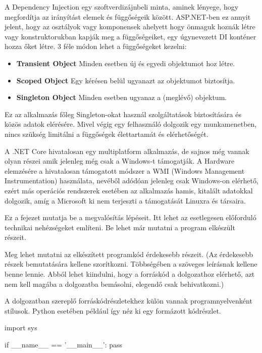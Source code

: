 A Dependency Injection egy szoftverdizájnbeli minta, aminek lényege, hogy megfordítja az irányítást elemek és függőségeik között. ASP.NET-ben ez annyit jelent, hogy az osztályok vagy komponensek ahelyett hogy önmaguk hoznák létre vagy konstruktorukban kapják meg a függőségeiket, egy úgynevezett DI konténer hozza őket létre. 3 féle módon lehet a függőségeket kezelni:
\begin{itemize}
\item\textbf{Transient Object} Minden esetben új és egyedi objektumot hoz létre.
\item\textbf{Scoped Object} Egy kérésen belül ugyanazt az objektumot biztosítja.
\item\textbf{Singleton Object} Minden esetben ugyanaz a (meglévő) objektum.
\end{itemize}
Ez az alkalmazás főleg Singleton-okat használ szolgáltatások biztosítására és közös adatok elérésére. Mivel végig egy felhasználó dolgozik egy munkamenetben, nincs szükség limitálni a függőségek élettartamát és elérhetőségét.

A .NET Core hivatalosan egy multiplatform alkalmazás, de sajnos még vannak olyan részei amik jelenleg még csak a Windows-t támogatják. A Hardware elemzésére a hivatalosan támogatott módszer a WMI (Windows Management Instrumentation) használata, nevéből adódóan jelenleg csak Windows-on elérhető, ezért más operációs rendszerek esetében az alkalmazás hamis, kitalált adatokkal dolgozik, amíg a Microsoft ki nem terjeszti a támogatását Linuxra és társaira.






Ez a fejezet mutatja be a megvalósítás lépéseit.
Itt lehet az esetlegesen előforduló technikai nehézségeket említeni.
Be lehet már mutatni a program elkészült részeit.

Meg lehet mutatni az elkészített programkód érdekesebb részeit.
(Az érdekesebb részek bemutatására kellene szorítkozni.
Többségében a szöveges leírásnak kellene benne lennie.
Abból lehet kiindulni, hogy a forráskód a dolgozathoz elérhető, azt nem kell magába a dolgozatba bemásolni, elegendő csak behivatkozni.)

A dolgozatban szereplő forráskódrészletekhez külön vannak programnyelvenként stílusok.
Python esetében például így néz ki egy formázott kódrészlet.
\begin{python}
import sys

if __name__ == '__main__':
    pass
\end{python}

